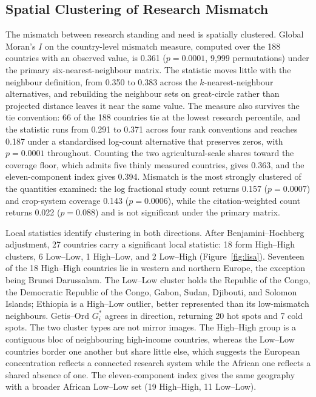 \documentclass[ASNA,twocolumn]{USG}
\begin{document}
\subsection{Spatial Clustering of Research Mismatch}

The mismatch between research standing and need is spatially clustered. Global Moran's $I$ on the country-level mismatch measure, computed over the 188 countries with an
observed value, is 0.361 ($p = 0.0001$, 9,999 permutations) under the primary six-nearest-neighbour
matrix. The statistic moves little with the neighbour definition, from 0.350 to 0.383 across the
$k$-nearest-neighbour alternatives, and rebuilding the neighbour sets on great-circle rather than
projected distance leaves it near the same value. The measure also survives the tie convention: 66
of the 188 countries tie at the lowest research percentile, and the statistic runs from 0.291 to
0.371 across four rank conventions and reaches 0.187 under a standardised log-count alternative
that preserves zeros, with $p = 0.0001$ throughout. Counting the two agricultural-scale shares
toward the coverage floor, which admits five thinly measured countries, gives 0.363, and the
eleven-component index gives 0.394. Mismatch is the
most strongly clustered of the quantities examined: the log fractional study count returns
0.157 ($p = 0.0007$) and crop-system coverage 0.143 ($p = 0.0006$), while the
citation-weighted count returns 0.022 ($p = 0.088$) and is not significant under the primary
matrix.

Local statistics identify clustering in both directions. After Benjamini--Hochberg adjustment, 27 countries carry a significant local statistic: 18 form
High--High clusters, 6 Low--Low, 1 High--Low, and 2 Low--High (Figure~\ref{fig:lisa}). Seventeen
of the 18 High--High countries lie in western and northern Europe, the exception being Brunei
Darussalam. The Low--Low cluster holds the Republic of the Congo, the Democratic Republic of the
Congo, Gabon, Sudan, Djibouti, and Solomon Islands; Ethiopia is a High--Low outlier, better
represented than its low-mismatch neighbours. Getis--Ord $G^{*}_{i}$ agrees in direction,
returning 20 hot spots and 7 cold spots. The two cluster types are not mirror images. The
High--High group is a contiguous bloc of neighbouring high-income countries, whereas the
Low--Low countries border one another but share little else, which suggests the European
concentration reflects a connected research system while the African one reflects a shared
absence of one. The
eleven-component index gives the same geography with a broader African Low--Low set (19
High--High, 11 Low--Low).
\end{document}
